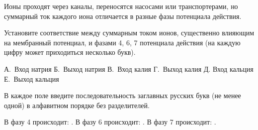 
Ионы проходят через каналы, переносятся насосами или транспортерами, но суммарный ток каждого иона отличается в разные фазы потенциала действия.

Установите соответствие между суммарным током ионов, существенно влияющим на мембранный потенциал, и фазами 4, 6, 7 потенциала действия (на каждую цифру может приходиться несколько букв).


А. Вход натрия
Б. Выход натрия
В. Вход калия
Г. Выход калия
Д. Вход кальция
Е. Выход кальция

В каждое поле введите последовательность заглавных русских букв (не менее одной) в алфавитном порядке без разделителей.

В фазу 4 происходит: \underline{\hspace{2in}}. В фазу 6 происходит: \underline{\hspace{2in}}. В фазу 7 происходит: \underline{\hspace{2in}}.